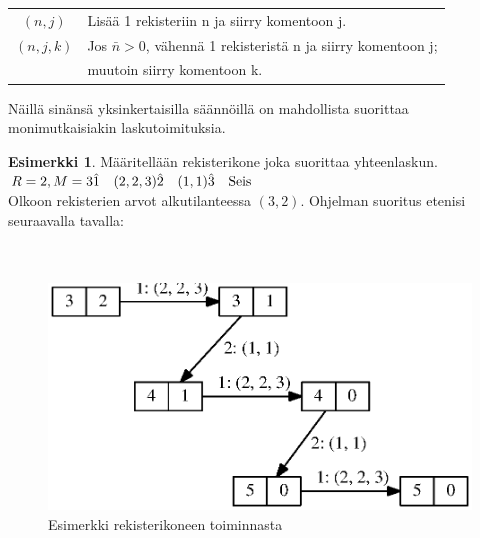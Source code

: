 \documentclass[a4paper, 12pt]{article}
\theoremstyle{definition}
\newtheorem{example}[mydef]{Esimerkki}
\theoremstyle{plain}
\begin{document}
\begin{tabular}{c l}
$(n, j)$ & Lisää 1 rekisteriin n ja siirry komentoon j. \\
$(n, j, k)$ & Jos $\bar{n} > 0$, vähennä 1 rekisteristä n ja siirry komentoon j; \\
& muutoin siirry komentoon k.\\
\end{tabular}


Näillä sinänsä yksinkertaisilla säännöillä on mahdollista suorittaa monimutkaisiakin laskutoimituksia.

\begin{example}
Määritellään rekisterikone joka suorittaa yhteenlaskun.
\\
\begin{math} \\
R = 2, M = 3 \\
\hat{1}\quad (2,2,3) \\
\hat{2}\quad (1,1) \\
\hat{3}\quad \text{Seis}\\
\end{math}
\\
Olkoon rekisterien arvot alkutilanteessa $(3, 2)$. Ohjelman suoritus etenisi seuraavalla tavalla:\\ \\
\\
\begin{figure}[H]
\begin{center}
\includegraphics{graph3.eps}
\caption{Esimerkki rekisterikoneen toiminnasta}
\end{center}
\end{figure}


\end{example}

\end{document}
